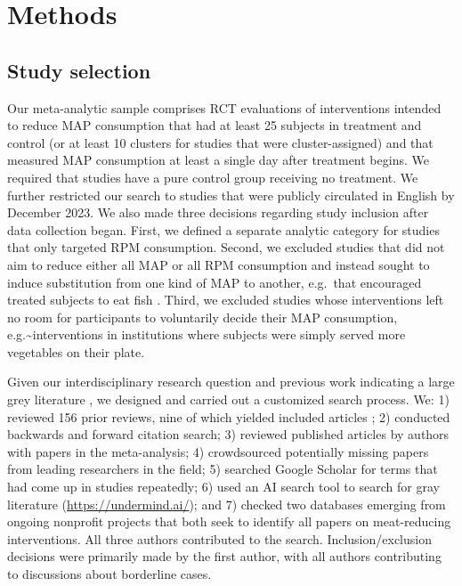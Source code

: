\documentclass[sn-nature,referee,lineno,pdflatex]{sn-jnl}
\begin{document}
\section{Methods}\label{sec3}

\subsection{Study selection}\label{sec3.1}


Our meta-analytic sample comprises RCT evaluations of interventions
intended to reduce MAP consumption that had at least 25 subjects in
treatment and control (or at least 10 clusters for studies that were
cluster-assigned) and that measured MAP consumption at least a single
day after treatment begins. We required that studies have a pure control
group receiving no treatment. We further restricted our search to
studies that were publicly circulated in English by December 2023. We
also made three decisions regarding study inclusion after data
collection began. First, we defined a separate analytic category for
studies that only targeted RPM consumption. Second, we excluded studies
that did not aim to reduce either all MAP or all RPM consumption and
instead sought to induce substitution from one kind of MAP to another,
e.g.~that encouraged treated subjects to eat fish \citep{johansen2009}.
Third, we excluded studies whose interventions left no room for
participants to voluntarily decide their MAP consumption,
e.g.\textasciitilde interventions in institutions where subjects were
simply served more vegetables on their plate.

Given our interdisciplinary research question and previous work
indicating a large grey literature \citep{mathur2021meta}, we designed
and carried out a customized search process. We: 1) reviewed 156 prior
reviews, nine of which yielded included articles
\citep{mathur2021meta, bianchi2018conscious, bianchi2018restructuring, ammann2023, chang2023, DiGennaro2024, harguess2020, ronto2022, wynes2018};
2) conducted backwards and forward citation search; 3) reviewed
published articles by authors with papers in the meta-analysis; 4)
crowdsourced potentially missing papers from leading researchers in the
field; 5) searched Google Scholar for terms that had come up in studies
repeatedly; 6) used an AI search tool to search for gray literature
(\url{https://undermind.ai/}); and 7) checked two databases emerging
from ongoing nonprofit projects that both seek to identify all papers on
meat-reducing interventions. All three authors contributed to the
search. Inclusion/exclusion decisions were primarily made by the first
author, with all authors contributing to discussions about borderline
cases.
\end{document}
